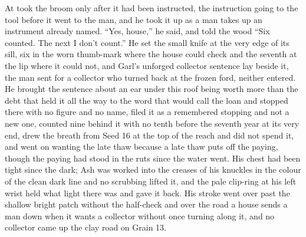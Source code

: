 \scenebreak

At   took the broom only after it had been instructed, the instruction going to the tool before it went to the man, and he took it up as a man takes up an instrument already named. “Yes, house,” he said, and told the wood “Six counted. The next I don't count.” He set the small knife at the very edge of its sill, six in the worn thumb-mark where the house could check and the seventh at the lip where it could not, and Garl's unforged collector sentence lay beside it, the man sent for a collector who turned back at the frozen ford, neither entered. He brought the sentence about an ear under this roof being worth more than the debt that held it all the way to the word that would call the loan and stopped there with no figure and no name, filed it as a remembered stopping and not a new one, counted nine behind it with no tenth before the seventh year at its very end, drew the breath from Seed 16 at the top of the reach and did not spend it, and went on wanting the late thaw because a late thaw puts off the paying, though the paying had stood in the ruts since the water went. His chest had been tight since the dark; Ash was worked into the creases of his knuckles in the colour of the clean dark line and no scrubbing lifted it, and the pale clip-ring at his left wrist held what light there was and gave it back. His stroke went over  past the shallow bright patch without the half-check and over the road a house sends a man down when it wants a collector without once turning along it, and no collector came up the clay road on Grain 13.

